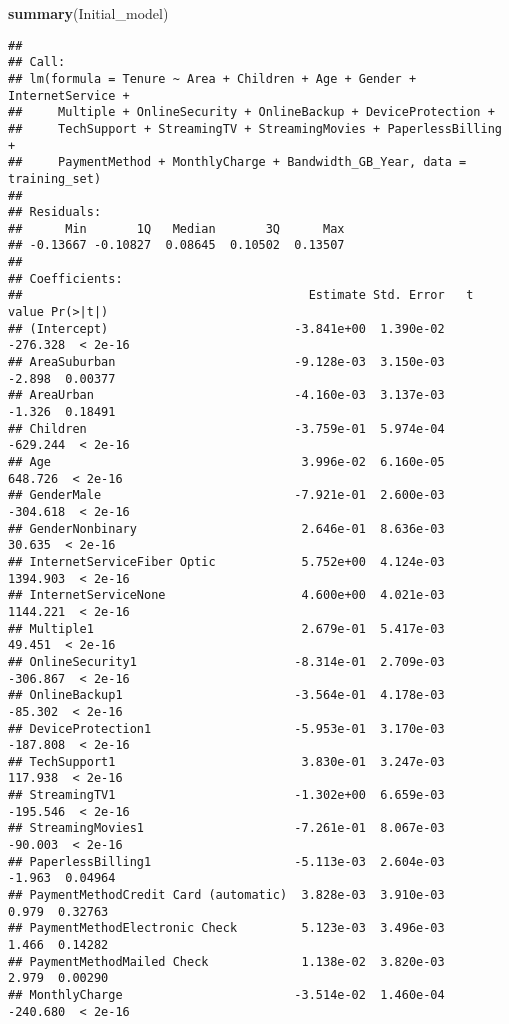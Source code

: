 \documentclass[
]{article}
\newenvironment{Shaded}{\begin{snugshade}}{\end{snugshade}}
\newcommand{\FunctionTok}[1]{\textcolor[rgb]{0.13,0.29,0.53}{\textbf{#1}}}
\newcommand{\NormalTok}[1]{#1}
\begin{document}
\begin{Shaded}
\begin{Highlighting}[]
\FunctionTok{summary}\NormalTok{(Initial\_model)}
\end{Highlighting}
\end{Shaded}

\begin{verbatim}
## 
## Call:
## lm(formula = Tenure ~ Area + Children + Age + Gender + InternetService + 
##     Multiple + OnlineSecurity + OnlineBackup + DeviceProtection + 
##     TechSupport + StreamingTV + StreamingMovies + PaperlessBilling + 
##     PaymentMethod + MonthlyCharge + Bandwidth_GB_Year, data = training_set)
## 
## Residuals:
##      Min       1Q   Median       3Q      Max 
## -0.13667 -0.10827  0.08645  0.10502  0.13507 
## 
## Coefficients:
##                                        Estimate Std. Error   t value Pr(>|t|)
## (Intercept)                          -3.841e+00  1.390e-02  -276.328  < 2e-16
## AreaSuburban                         -9.128e-03  3.150e-03    -2.898  0.00377
## AreaUrban                            -4.160e-03  3.137e-03    -1.326  0.18491
## Children                             -3.759e-01  5.974e-04  -629.244  < 2e-16
## Age                                   3.996e-02  6.160e-05   648.726  < 2e-16
## GenderMale                           -7.921e-01  2.600e-03  -304.618  < 2e-16
## GenderNonbinary                       2.646e-01  8.636e-03    30.635  < 2e-16
## InternetServiceFiber Optic            5.752e+00  4.124e-03  1394.903  < 2e-16
## InternetServiceNone                   4.600e+00  4.021e-03  1144.221  < 2e-16
## Multiple1                             2.679e-01  5.417e-03    49.451  < 2e-16
## OnlineSecurity1                      -8.314e-01  2.709e-03  -306.867  < 2e-16
## OnlineBackup1                        -3.564e-01  4.178e-03   -85.302  < 2e-16
## DeviceProtection1                    -5.953e-01  3.170e-03  -187.808  < 2e-16
## TechSupport1                          3.830e-01  3.247e-03   117.938  < 2e-16
## StreamingTV1                         -1.302e+00  6.659e-03  -195.546  < 2e-16
## StreamingMovies1                     -7.261e-01  8.067e-03   -90.003  < 2e-16
## PaperlessBilling1                    -5.113e-03  2.604e-03    -1.963  0.04964
## PaymentMethodCredit Card (automatic)  3.828e-03  3.910e-03     0.979  0.32763
## PaymentMethodElectronic Check         5.123e-03  3.496e-03     1.466  0.14282
## PaymentMethodMailed Check             1.138e-02  3.820e-03     2.979  0.00290
## MonthlyCharge                        -3.514e-02  1.460e-04  -240.680  < 2e-16

\end{verbatim}
\end{document}
